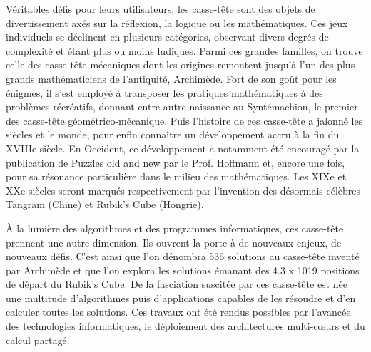 Véritables défis pour leurs utilisateurs, les casse-tête sont des objets de divertissement axés sur la réflexion, la logique ou les mathématiques. Ces jeux individuels se déclinent en plusieurs catégories, observant divers degrés de complexité et étant plus ou moins ludiques. Parmi ces grandes familles, on trouve celle des casse-tête mécaniques dont les origines remontent jusqu’à l’un des plus grands mathématiciens de l’antiquité, Archimède. Fort de son goût pour les énigmes, il s’est employé à transposer les pratiques mathématiques à des problèmes récréatifs, donnant entre-autre naissance au Syntémachion, le premier des casse-tête géométrico-mécanique. Puis l’histoire de ces casse-tête a jalonné les siècles et le monde, pour enfin connaître un développement accru à la fin du XVIIIe siècle. En Occident, ce développement a notamment été encouragé par la publication de Puzzles old and new par le Prof. Hoffmann et, encore une fois, pour sa résonance particulière dans le milieu des mathématiques. Les XIXe et XXe siècles seront marqués respectivement par l’invention des désormais célèbres Tangram (Chine) et Rubik’s Cube (Hongrie). \newline

À la lumière des algorithmes et des programmes informatiques, ces casse-tête prennent une autre dimension. Ils ouvrent la porte à de nouveaux enjeux, de nouveaux défis. C’est ainsi que l’on dénombra 536 solutions au casse-tête inventé par Archimède et que l’on explora les solutions émanant des 4.3 x 1019  positions de départ du Rubik’s Cube. De la fasciation suscitée par ces casse-tête est née une multitude d’algorithmes puis d’applications capables de les résoudre et d’en calculer toutes les solutions. Ces travaux ont été rendus possibles par l’avancée des technologies informatiques, le déploiement des architectures multi-cœurs et du calcul partagé.  \newline

